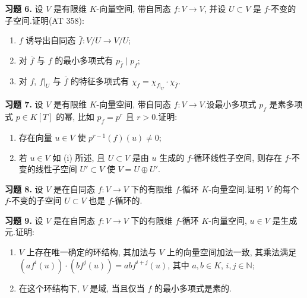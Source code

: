 \medskip
\noindent\textbf{习题 6.} 设 $V$ 是有限维 $K$-向量空间, 带自同态 $f \colon V \longrightarrow V$, 并设 $U \subset V$ 是 $f$-不变的子空间.证明(AT 358):
\begin{enumerate}
\item[(i)] $f$ 诱导出自同态 $\bar{f} \colon V/U \longrightarrow V/U$;
\item[(ii)] 对 $\bar{f}$ 与 $f$ 的最小多项式有 $p_{\bar{f}} \mid p_f$;
\item[(iii)] 对 $f$, $f|_U$ 与 $\bar{f}$ 的特征多项式有 $\chi_f = \chi_{f|_U} \cdot \chi_{\bar{f}}$.
\end{enumerate}

\medskip
\noindent\textbf{习题 7.} 设 $V$ 是有限维 $K$-向量空间, 带自同态 $f \colon V \longrightarrow V$.设最小多项式 $p_f$ 是素多项式 $p \in K[T]$ 的幂, 比如 $p_f = p^r$ 且 $r > 0$.证明:
\begin{enumerate}
\item[(i)] 存在向量 $u \in V$ 使 $p^{r - 1}(f)(u) \neq 0$;
\item[(ii)] 若 $u \in V$ 如 (i) 所述, 且 $U \subset V$ 是由 $u$ 生成的 $f$-循环线性子空间, 则存在 $f$-不变的线性子空间 $U' \subset V$ 使 $V = U \oplus U'$.
\end{enumerate}

\medskip
\noindent\textbf{习题 8.} 设 $V$ 是在自同态 $f \colon V \longrightarrow V$ 下的有限维 $f$-循环 $K$-向量空间.证明 $V$ 的每个 $f$-不变的子空间 $U \subset V$ 也是 $f$-循环的.

\medskip
\noindent\textbf{习题 9.} 设 $V$ 是在自同态 $f \colon V \longrightarrow V$ 下的有限维 $f$-循环 $K$-向量空间, $u \in V$ 是生成元.证明:
\begin{enumerate}
\item[(i)] $V$ 上存在唯一确定的环结构, 其加法与 $V$ 上的向量空间加法一致, 其乘法满足 $(a f^i(u)) \cdot (b f^j(u)) = ab f^{i + j}(u)$, 其中 $a, b \in K$, $i, j \in \mathbb{N}$;
\item[(ii)] 在这个环结构下, $V$ 是域, 当且仅当 $f$ 的最小多项式是素的.
\end{enumerate}

